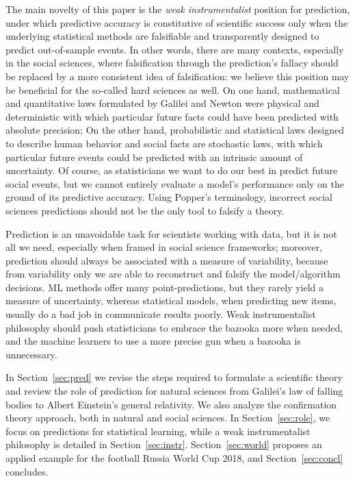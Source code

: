 \documentclass{statsoc}
\begin{document}
The main novelty of this paper is the \emph{weak instrumentalist} position for prediction, under which predictive accuracy is constitutive of scientific success only when the 
underlying statistical methods are falsifiable and transparently designed to predict out-of-sample events.  In other words, there are many contexts, especially in the social sciences, where falsification through the prediction's fallacy should be replaced by a more consistent idea of falsification: we believe this position may be beneficial for the so-called hard sciences as well.  On one hand, mathematical and quantitative laws formulated by Galilei and Newton 
were physical and deterministic with which  particular future facts could have been predicted with absolute precision; On the other hand, probabilistic and statistical laws designed 
to describe human behavior and social facts are stochastic laws, with which particular future  events could be predicted with an intrinsic amount of uncertainty. 
Of course, as statisticians we want to do our best in predict future social events, but we cannot entirely evaluate a model's performance only on the ground of its predictive accuracy. Using Popper's terminology, incorrect social sciences predictions should not be the only tool to falsify a theory.

Prediction is an unavoidable task for scientists working 
with data, but it is not all we need, especially when framed in social science frameworks; moreover, prediction should always be associated with a measure of variability, because from variability only we are able to reconstruct and 
falsify the model/algorithm decisions. ML methods offer many point-predictions,  but they rarely yield a measure of uncertainty, whereas statistical 
models, when predicting new items, usually do a bad job in communicate results poorly. Weak instrumentalist philosophy should push statisticians to embrace the bazooka more when needed, and the machine learners to use a more precise gun when a bazooka is unnecessary.

In Section~\ref{sec:pred} we revise the steps required to formulate a scientific theory and review the role of prediction for natural sciences from Galilei's law of falling bodies to 
Albert Einstein's general relativity. We also analyze the confirmation theory approach, both in natural and social sciences. In Section~\ref{sec:role}, we focus on 
predictions for statistical learning, while a weak instrumentalist philosophy is detailed in Section~\ref{sec:instr}. Section~\ref{sec:world} proposes an applied example for the football Russia World Cup 2018, and Section~\ref{sec:concl} concludes.
\end{document}
